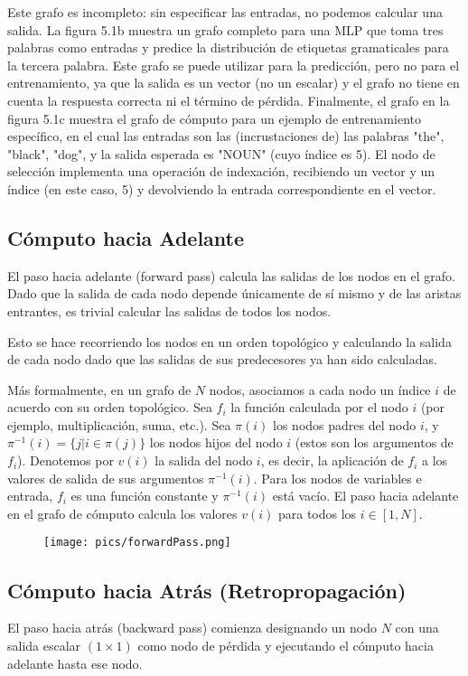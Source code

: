 Este grafo es incompleto: sin especificar las entradas, no podemos calcular una salida. La figura 5.1b muestra un grafo completo para una MLP que toma tres palabras como entradas y predice la distribución de etiquetas gramaticales para la tercera palabra. Este grafo se puede utilizar para la predicción, pero no para el entrenamiento, ya que la salida es un vector (no un escalar) y el grafo no tiene en cuenta la respuesta correcta ni el término de pérdida. Finalmente, el grafo en la figura 5.1c muestra el grafo de cómputo para un ejemplo de entrenamiento específico, en el cual las entradas son las (incrustaciones de) las palabras "the", "black", "dog", y la salida esperada es "NOUN" (cuyo índice es 5). El nodo de selección implementa una operación de indexación, recibiendo un vector y un índice (en este caso, 5) y devolviendo la entrada correspondiente en el vector.

\subsection{Cómputo hacia Adelante}
El paso hacia adelante (forward pass) calcula las salidas de los nodos en el grafo. Dado que la salida de cada nodo depende únicamente de sí mismo y de las aristas entrantes, es trivial calcular las salidas de todos los nodos.

Esto se hace recorriendo los nodos en un orden topológico y calculando la salida de cada nodo dado que las salidas de sus predecesores ya han sido calculadas.

Más formalmente, en un grafo de $N$ nodos, asociamos a cada nodo un índice $i$ de acuerdo con su orden topológico. Sea $f_i$ la función calculada por el nodo $i$ (por ejemplo, multiplicación, suma, etc.). Sea $\pi(i)$ los nodos padres del nodo $i$, y $\pi^{-1}(i) = \{j | i \in \pi(j)\}$ los nodos hijos del nodo $i$ (estos son los argumentos de $f_i$). Denotemos por $v(i)$ la salida del nodo $i$, es decir, la aplicación de $f_i$ a los valores de salida de sus argumentos $\pi^{-1}(i)$. Para los nodos de variables e entrada, $f_i$ es una función constante y $\pi^{-1}(i)$ está vacío. El paso hacia adelante en el grafo de cómputo calcula los valores $v(i)$ para todos los $i \in [1,N]$.

\begin{figure}[htb]
	\centering
	 \texttt{[image: pics/forwardPass.png]}
\end{figure}

\subsection{Cómputo hacia Atrás (Retropropagación)}
El paso hacia atrás (backward pass) comienza designando un nodo $N$ con una salida escalar $(1 \times 1)$ como nodo de pérdida y ejecutando el cómputo hacia adelante hasta ese nodo.

